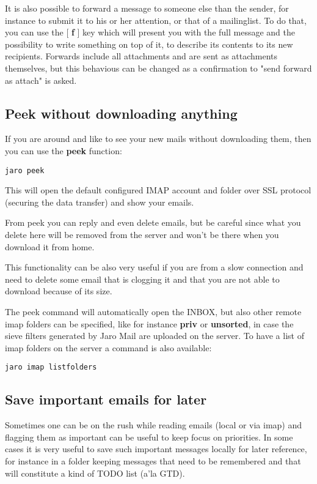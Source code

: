 \documentclass[a4,onecolumn,portrait]{article}
\begin{document}
It is also possible to forward a message to someone else than the
sender, for instance to submit it to his or her attention, or that of
a mailinglist. To do that, you can use the [ \textbf{f} ] key which will
present you with the full message and the possibility to write
something on top of it, to describe its contents to its new
recipients. Forwards include all attachments and are sent as attachments themselves, but this behavious can be changed as a confirmation to "send forward as attach" is asked.
\subsection{Peek without downloading anything}
\label{sec-6-4}

If you are around and like to see your new mails without downloading
them, then you can use the \textbf{peek} function:

\begin{verbatim}
jaro peek
\end{verbatim}

This will open the default configured IMAP account and folder over SSL
protocol (securing the data transfer) and show your emails.

From peek you can reply and even delete emails, but be careful since
what you delete here will be removed from the server and won't be
there when you download it from home.

This functionality can be also very useful if you are from a slow
connection and need to delete some email that is clogging it and that
you are not able to download because of its size.

The peek command will automatically open the INBOX, but also other remote imap folders can be specified, like for instance \textbf{priv} or \textbf{unsorted}, in case the sieve filters generated by Jaro Mail are uploaded on the server. To have a list of imap folders on the server a command is also available:

\begin{verbatim}
jaro imap listfolders
\end{verbatim}

\subsection{Save important emails for later}
\label{sec-6-5}

Sometimes one can be on the rush while reading emails (local or via
imap) and flagging them as important can be useful to keep focus on
priorities. In some cases it is very useful to save such important
messages locally for later reference, for instance in a folder keeping
messages that need to be remembered and that will constitute a kind of
TODO list (a'la GTD).
\end{document}
